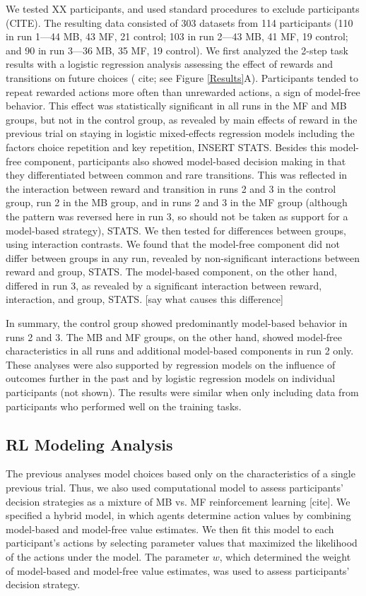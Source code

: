 \documentclass[11pt]{article} %
\begin{document}
We tested XX participants, and used standard procedures to exclude participants (CITE). The resulting data consisted of 303 datasets from 114 participants (110 in run 1---44 MB, 43 MF, 21 control; 103 in run 2---43 MB, 41 MF, 19 control; and 90 in run 3---36 MB, 35 MF, 19 control). We first analyzed the 2-step task results with a logistic regression analysis assessing the effect of rewards and transitions on future choices ( cite; see Figure \ref{Results}A). Participants tended to repeat rewarded actions more often than unrewarded actions, a sign of model-free behavior. This effect was statistically significant in all runs in the MF and MB groups, but not in the control group, as revealed by main effects of reward in the previous trial on staying in logistic mixed-effects regression models including the factors choice repetition and key repetition, INSERT STATS. Besides this model-free component, participants also showed model-based decision making in that they differentiated between common and rare transitions. This was reflected in the interaction between reward and transition in runs 2 and 3 in the control group, run 2 in the MB group, and in runs 2 and 3 in the MF group (although the pattern was reversed here in run 3, so should not be taken as support for a model-based strategy), STATS. We then tested for differences between groups, using interaction contrasts. We found that the model-free component did not differ between groups in any run, revealed by non-significant interactions between reward and group, STATS. The model-based component, on the other hand, differed in run 3, as revealed by a significant interaction between reward, interaction, and group, STATS. [say what causes this difference]

In summary, the control group showed predominantly model-based behavior in runs 2 and 3. The MB and MF groups, on the other hand, showed model-free characteristics in all runs and additional model-based components in run 2 only. These analyses were also supported by regression models on the influence of outcomes further in the past and by logistic regression models on individual participants (not shown). The results were similar when only including data from participants who performed well on the training tasks.

\subsection{RL Modeling Analysis}
The previous analyses model choices based only on the characteristics of a single previous trial. Thus, we also used computational model to assess participants' decision strategies as a mixture of MB vs. MF reinforcement learning [cite]. We specified a hybrid model, in which agents determine action values by combining model-based and model-free value estimates. We then fit this model to each participant's actions by selecting parameter values that maximized the likelihood of the actions under the model. The parameter $w$, which determined the weight of model-based and model-free value estimates, was used to assess participants' decision strategy.
\end{document}
